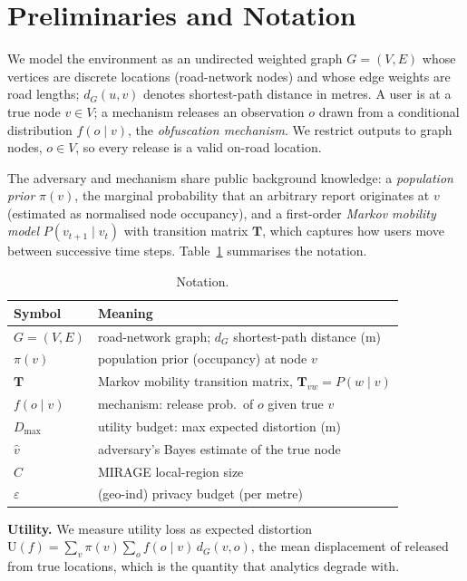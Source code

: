 \documentclass[10pt,journal,compsoc]{IEEEtran}
\newcommand{\dG}{d_{G}}
\begin{document}
\section{Preliminaries and Notation}
\label{sec:prelim}
We model the environment as an undirected weighted graph $G=(V,E)$ whose vertices
are discrete locations (road-network nodes) and whose edge weights are road
lengths; $\dG(u,v)$ denotes shortest-path distance in metres. A user is at a true
node $v\in V$; a mechanism releases an observation $o$ drawn from a conditional
distribution $f(o\mid v)$, the \emph{obfuscation mechanism}. We restrict outputs
to graph nodes, $o\in V$, so every release is a valid on-road location.

The adversary and mechanism share public background knowledge: a \emph{population
prior} $\pi(v)$, the marginal probability that an arbitrary report originates at
$v$ (estimated as normalised node occupancy), and a first-order \emph{Markov
mobility model} $P(v_{t+1}\mid v_t)$ with transition matrix $\mathbf{T}$, which
captures how users move between successive time steps. Table~\ref{tab:notation}
summarises the notation.

\begin{table}[t]\centering
\caption{Notation.}
\label{tab:notation}
\begin{tabular}{ll}
\toprule
Symbol & Meaning \\
\midrule
$G=(V,E)$ & road-network graph; $\dG$ shortest-path distance (m) \\
$\pi(v)$ & population prior (occupancy) at node $v$ \\
$\mathbf{T}$ & Markov mobility transition matrix, $\mathbf{T}_{vw}=P(w\mid v)$ \\
$f(o\mid v)$ & mechanism: release prob.\ of $o$ given true $v$ \\
$D_{\max}$ & utility budget: max expected distortion (m) \\
$\hat v$ & adversary's Bayes estimate of the true node \\
$C$ & MIRAGE local-region size \\
$\varepsilon$ & (geo-ind) privacy budget (per metre) \\
\bottomrule
\end{tabular}
\end{table}

\textbf{Utility.} We measure utility loss as expected distortion
$\mathrm{U}(f)=\sum_v \pi(v)\sum_o f(o\mid v)\,\dG(v,o)$, the mean displacement of
released from true locations, which is the quantity that analytics degrade with.
\end{document}
